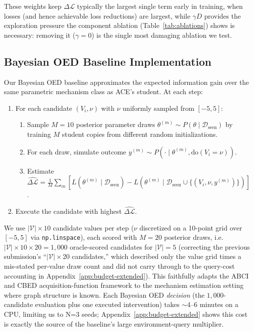 These weights keep $\Delta\mathcal{L}$ typically the largest single term early in training, when losses (and hence achievable loss reductions) are largest, while $\gamma D$ provides the exploration pressure the component ablation (Table~\ref{tab:ablations}) shows is necessary: removing it ($\gamma=0$) is the single most damaging ablation we test.

\subsection{Bayesian OED Baseline Implementation}
\label{app:boed-impl}

Our Bayesian OED baseline approximates the expected information gain over the same parametric mechanism class as ACE's student. At each step:
\begin{enumerate}[leftmargin=1.5em]
\item For each candidate $(V_i, \nu)$ with $\nu$ uniformly sampled from $[-5, 5]$:
  \begin{enumerate}
    \item Sample $M=10$ posterior parameter draws $\theta^{(m)} \sim P(\theta \mid \mathcal{D}_\text{seen})$ by training $M$ student copies from different random initializations.
    \item For each draw, simulate outcome $y^{(m)} \sim P(\cdot \mid \theta^{(m)}, \text{do}(V_i = \nu))$.
    \item Estimate $\widehat{\Delta\mathcal{L}} = \frac{1}{M}\sum_m [L(\theta^{(m)} \mid \mathcal{D}_\text{seen}) - L(\theta^{(m)} \mid \mathcal{D}_\text{seen} \cup \{(V_i, \nu, y^{(m)})\})]$.
  \end{enumerate}
\item Execute the candidate with highest $\widehat{\Delta\mathcal{L}}$.
\end{enumerate}
We use $|\mathcal{V}| \times 10$ candidate values per step ($\nu$ discretized on a 10-point grid over $[-5,5]$ via \texttt{np.linspace}), each scored with $M=20$ posterior draws, i.e.\ $|\mathcal{V}|\times10\times20 = 1{,}000$ oracle-scored candidates for $|\mathcal{V}|=5$ (correcting the previous submission's ``$|\mathcal{V}|\times20$ candidates,'' which described only the value grid times a mis-stated per-value draw count and did not carry through to the query-cost accounting in Appendix~\ref{app:budget-extended}). This faithfully adapts the ABCI \citep{toth2022active} and CBED \citep{tigas2022interventions} acquisition-function framework to the mechanism estimation setting where graph structure is known. Each Bayesian OED \emph{decision} (the $1{,}000$-candidate evaluation plus one executed intervention) takes $\sim$4--6 minutes on a CPU, limiting us to N=3 seeds; Appendix~\ref{app:budget-extended} shows this cost is exactly the source of the baseline's large environment-query multiplier.

